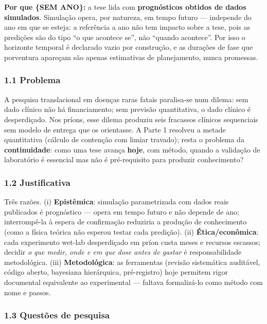 \documentclass[
  10pt,
]{article}
\begin{document}
\textbf{Por que \{SEM ANO\}:} a tese lida com \textbf{prognósticos
obtidos de dados simulados}. Simulação opera, por natureza, em tempo
futuro --- independe do ano em que se esteja: a referência a ano não tem
impacto sobre a tese, pois as predições são do tipo ``o que acontece
se'', não ``quando acontece''. Por isso o horizonte temporal é declarado
vazio por construção, e as durações de fase que porventura apareçam são
apenas estimativas de planejamento, nunca promessas.

\hypertarget{problema}{%
\subsubsection{1.1 Problema}\label{problema}}

A pesquisa translacional em doenças raras fatais paralisa-se num dilema:
sem dado clínico não há financiamento; sem previsão quantitativa, o dado
clínico é desperdiçado. Nos príons, esse dilema produziu seis fracassos
clínicos sequenciais sem modelo de entrega que os orientasse. A Parte 1
resolveu a metade quantitativa (cálculo de contenção com limiar
travado); resta o problema da \textbf{continuidade}: como uma tese
avança \textbf{hoje}, com método, quando a validação de laboratório é
essencial mas não é pré-requisito para produzir conhecimento?

\hypertarget{justificativa}{%
\subsubsection{1.2 Justificativa}\label{justificativa}}

Três razões. (i) \textbf{Epistêmica}: simulação parametrizada com dados
reais publicados é prognóstico --- opera em tempo futuro e não depende
de ano; interrompê-la à espera de confirmação reduziria a produção de
conhecimento (como a física teórica não esperou testar cada predição).
(ii) \textbf{Ética/econômica}: cada experimento wet-lab desperdiçado em
príon custa meses e recursos escassos; decidir \emph{o que medir, onde e
em que dose antes de gastar} é responsabilidade metodológica. (iii)
\textbf{Metodológica}: as ferramentas (revisão sistemática auditável,
código aberto, bayesiana hierárquica, pré-registro) hoje permitem rigor
documental equivalente ao experimental --- faltava formalizá-lo como
método com nome e passos.

\hypertarget{questuxf5es-de-pesquisa}{%
\subsubsection{1.3 Questões de pesquisa}\label{questuxf5es-de-pesquisa}}
\end{document}
